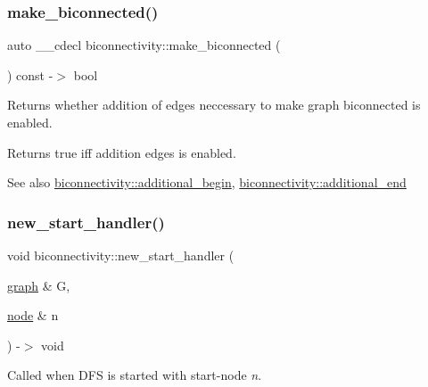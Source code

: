 \subsubsection{\texorpdfstring{make\+\_\+biconnected()}{make\_biconnected()}\hspace{0.1cm}{\footnotesize\ttfamily [2/2]}}
{\footnotesize\ttfamily auto \+\_\+\+\_\+cdecl biconnectivity\+::make\+\_\+biconnected (\begin{DoxyParamCaption}{ }\end{DoxyParamCaption}) const -\/$>$ bool
	\hspace{0.3cm}{\ttfamily [inline]}}



Returns whether addition of edges neccessary to make graph biconnected is enabled. 

\begin{DoxyReturn}{Returns}
true iff addition edges is enabled. 
\end{DoxyReturn}
\begin{DoxySeeAlso}{See also}
\mbox{\hyperlink{classbiconnectivity_a896398c41cf0c84714b4cc7475aafc6e}{biconnectivity\+::additional\+\_\+begin}}, \mbox{\hyperlink{classbiconnectivity_a8efa922c941f73613a3083fbd3e9b5df}{biconnectivity\+::additional\+\_\+end}} 
\end{DoxySeeAlso}
\mbox{\label{classbiconnectivity_a64424eec8e317b08605f8b6b952bace4}} 
\subsubsection{\texorpdfstring{new\+\_\+start\+\_\+handler()}{new\_start\_handler()}}
{\footnotesize\ttfamily void biconnectivity\+::new\+\_\+start\+\_\+handler (\begin{DoxyParamCaption}\item[{\mbox{\hyperlink{classgraph}{graph}} \&}]{G,  }\item[{\mbox{\hyperlink{classnode}{node}} \&}]{n }\end{DoxyParamCaption}) -\/$>$ void\hspace{0.3cm}{\ttfamily [virtual]}}



Called when D\+FS is started with start-\/node {\itshape n}. 

